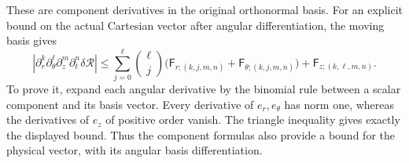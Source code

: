 \documentclass[11pt]{article}
\begin{document}
These are component derivatives in the original orthonormal basis.
For an explicit bound on the actual Cartesian vector after angular
differentiation, the moving basis gives
\[
 \left|\partial_r^k\partial_\theta^\ell\partial_z^m\partial_t^n
                 \delta\mathcal R\right|
 \le\sum_{j=0}^\ell\binom\ell j
       \bigl(\mathsf F_{r;(k,j,m,n)}
             +\mathsf F_{\theta;(k,j,m,n)}\bigr)
       +\mathsf F_{z;(k,\ell,m,n)}.
\]
To prove it, expand each angular derivative by the binomial rule
between a scalar component and its basis vector. Every derivative of
\(e_r,e_\theta\) has norm one, whereas the derivatives of \(e_z\)
of positive order vanish. The triangle inequality gives exactly the
displayed bound. Thus the component formulas also provide a bound
for the physical vector, with its angular basis differentiation.
\end{document}
